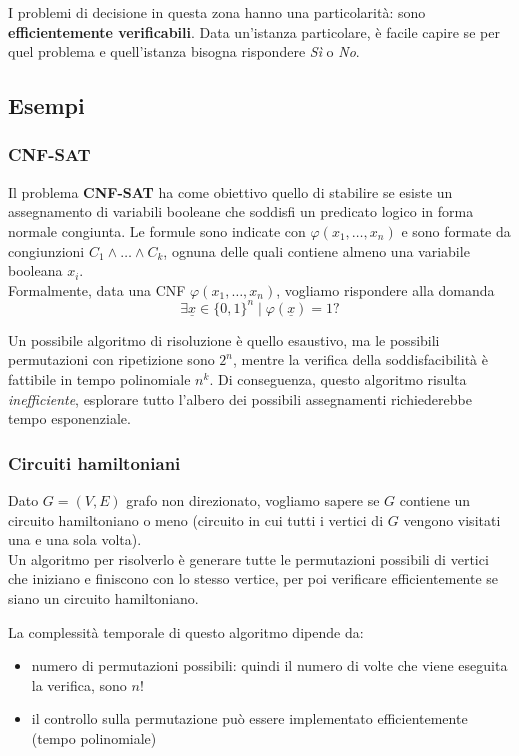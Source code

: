 I problemi di decisione in questa zona hanno una particolarità: sono \textbf{efficientemente verificabili}. Data un'istanza particolare, è facile capire se per quel problema e quell'istanza bisogna rispondere \textit{Sì} o  \textit{No}.\\

\subsection{Esempi}

\subsubsection{CNF-SAT}

Il problema \textbf{CNF-SAT} ha come obiettivo quello di stabilire se esiste un assegnamento di variabili booleane che soddisfi un predicato logico in forma normale congiunta. Le formule sono indicate con $\varphi (x_1, \dots, x_n)$ e sono formate da congiunzioni $C_1 \wedge \dots \wedge C_k$, ognuna delle quali contiene almeno una variabile booleana $x_i$.\\

Formalmente, data una CNF $\varphi(x_1, \dots, x_n)$, vogliamo rispondere alla domanda
$$ \exists \underline{x} \in \{0,1\}^n \mid \varphi(\underline{x}) = 1 ?$$

Un possibile algoritmo di risoluzione è quello esaustivo, ma le possibili permutazioni con ripetizione sono $2^n$, mentre la verifica della soddisfacibilità è fattibile in tempo polinomiale $n^k$. Di conseguenza, questo algoritmo risulta \textit{inefficiente}, esplorare tutto l'albero dei possibili assegnamenti richiederebbe tempo esponenziale.\\

\subsubsection{Circuiti hamiltoniani}

Dato $G = (V,E)$ grafo non direzionato, vogliamo sapere se $G$ contiene un circuito hamiltoniano o meno (circuito in cui tutti i vertici di $G$ vengono visitati una e una sola volta).\\

Un algoritmo per risolverlo è generare tutte le permutazioni possibili di vertici che iniziano e finiscono con lo stesso vertice, per poi verificare efficientemente se siano un circuito hamiltoniano.

La complessità temporale di questo algoritmo dipende da: 
\begin{itemize}
	\item numero di permutazioni possibili: quindi il numero di volte che viene eseguita la verifica, sono $n!$
	\item il controllo sulla permutazione può essere implementato efficientemente (tempo polinomiale)
\end{itemize}

